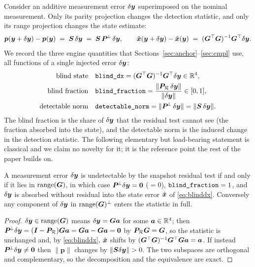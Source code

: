 Consider an additive measurement error $\delta\bm{y}$ superimposed on the nominal
measurement. Only its parity projection changes the detection statistic, and only its
range projection changes the state estimate:
\begin{equation}
  \bm p(\bm{y}+\delta\bm{y}) - \bm p(\bm{y}) \;=\; \bm{S}\,\delta\bm{y} \;=\; \bm{S}\,\bm{P}^{\!\perp}\,\delta\bm{y},
  \qquad
  \hat{\bm{x}}(\bm{y}+\delta\bm{y}) - \hat{\bm{x}}(\bm{y}) \;=\; (\bm{G}^\top\bm{G})^{-1}\bm{G}^\top\delta\bm{y} .
  \label{eq:split}
\end{equation}
We record the three engine quantities that Sections~\ref{sec:anchor}--\ref{sec:cmpl}
use, all functions of a single injected error $\delta\bm{y}$:
\begin{align}
  \text{blind state}\quad
    &\texttt{blind\_dx} = (\bm{G}^\top\bm{G})^{-1}\bm{G}^\top\delta\bm{y} \in\mathbb{R}^4,
    \label{eq:blinddx}\\
  \text{blind fraction}\quad
    &\texttt{blind\_fraction} = \frac{\|\bm{P}_{\mathcal{R}}\,\delta\bm{y}\|}{\|\delta\bm{y}\|} \in[0,1],
    \label{eq:blindfrac}\\
  \text{detectable norm}\quad
    &\texttt{detectable\_norm} = \|\bm{P}^{\!\perp}\,\delta\bm{y}\| = \|\bm{S}\,\delta\bm{y}\| .
    \label{eq:detnorm}
\end{align}
The blind fraction is the share of $\delta\bm{y}$ that the residual test cannot see (the
fraction absorbed into the state), and the detectable norm is the induced change in the
detection statistic. The following elementary but load-bearing statement is classical
and we claim no novelty for it; it is the reference point the rest of the paper builds
on.

\begin{proposition}
\label{prop:blind}
A measurement error $\delta\bm{y}$ is undetectable by the snapshot residual test if and
only if it lies in $\operatorname{range}(\bm{G})$, in which case $\bm{P}^{\!\perp}\delta\bm{y}=\bm 0$
($=0$), $\texttt{blind\_fraction}=1$, and $\delta\bm{y}$ is absorbed
without residual into the state error $\hat{\bm{x}}$ of \eqref{eq:blinddx}. Conversely any
component of $\delta\bm{y}$ in $\operatorname{range}(\bm{G})^{\perp}$ enters the statistic in full.
\end{proposition}

\begin{proof}
$\delta\bm{y}\in\operatorname{range}(\bm{G})$ means $\delta\bm{y}=\bm{G}\bm a$ for some $\bm a\in\mathbb{R}^4$; then
$\bm{P}^{\!\perp}\delta\bm{y}=(\bm I-\bm{P}_{\mathcal{R}})\bm{G}\bm a=\bm{G}\bm a-\bm{G}\bm a=\bm 0$ by
$\bm{P}_{\mathcal{R}}\bm{G}=\bm{G}$, so the statistic is unchanged and, by \eqref{eq:blinddx},
$\hat{\bm{x}}$ shifts by $(\bm{G}^\top\bm{G})^{-1}\bm{G}^\top\bm{G}\bm a=\bm a$. If instead
$\bm{P}^{\!\perp}\delta\bm{y}\ne\bm 0$ then $\|\bm p\|$ changes by $\|\Smat\delta\yv\|>0$. The two
subspaces are orthogonal and complementary, so the decomposition and the equivalence
are exact.
\end{proof}

